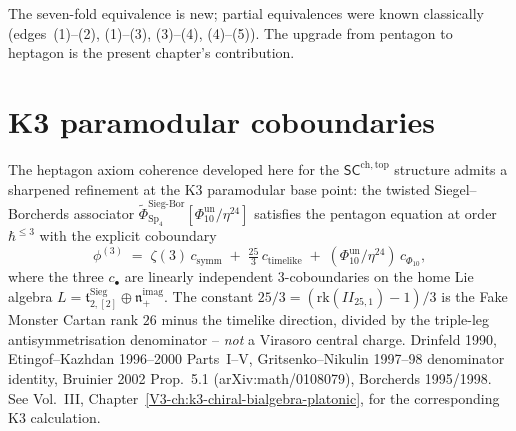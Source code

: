 The seven-fold equivalence is new; partial equivalences were known
classically (edges~(1)--(2), (1)--(3), (3)--(4), (4)--(5)). The
upgrade from pentagon to heptagon is the present chapter's
contribution.

\section{K3 paramodular coboundaries}
\label{sec:schtop-heptagon-supplement}

\begin{remark}
\label{rem:schtop-heptagon-1}
The heptagon axiom coherence developed here for the $\mathsf{SC}^{\mathrm{ch,top}}$
structure admits a sharpened refinement at the K3 paramodular base point:
the twisted Siegel--Borcherds associator
$\widetilde{\Phi}^{\mathrm{Sieg\text{-}Bor}}_{\mathrm{Sp}_4}[\Phi_{10}^{\mathrm{un}}/\eta^{24}]$
satisfies the pentagon equation at order $\hbar^{\le 3}$ with the
explicit coboundary
\[
\phi^{(3)} \;=\; \zeta(3)\,c_{\mathrm{symm}} \;+\; \tfrac{25}{3}\,c_{\mathrm{timelike}} \;+\; (\Phi_{10}^{\mathrm{un}}/\eta^{24})\,c_{\Phi_{10}},
\]
where the three $c_{\bullet}$ are linearly independent $3$-coboundaries
on the home Lie algebra $L = \mathfrak t^{\mathrm{Sieg}}_{2,[2]}\oplus\mathfrak n_+^{\mathrm{imag}}$.
The constant $25/3 = (\mathrm{rk}(II_{25,1}) - 1)/3$ is the Fake
Monster Cartan rank $26$ minus the timelike direction, divided by the
triple-leg antisymmetrisation denominator -- \emph{not} a Virasoro
central charge. Drinfeld 1990, Etingof--Kazhdan 1996--2000 Parts~I--V,
Gritsenko--Nikulin 1997--98 denominator identity, Bruinier 2002
Prop.~5.1 (arXiv:math/0108079), Borcherds 1995/1998.
See Vol.~III, Chapter~\ref{V3-ch:k3-chiral-bialgebra-platonic},
for the corresponding K3 calculation.
\end{remark}

